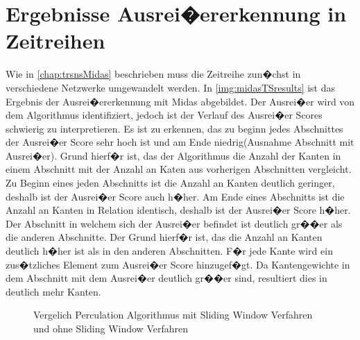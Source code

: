 \section{Ergebnisse Ausrei�ererkennung in Zeitreihen}
Wie in \autoref{chap:trsnsMidas} beschrieben muss die Zeitreihe zun�chst in verschiedene Netzwerke umgewandelt werden. In \autoref{img:midasTSresults} ist das Ergebnis der Ausrei�ererkennung mit Midas abgebildet. Der Ausrei�er wird von dem Algorithmus identifiziert, jedoch ist der Verlauf des Ausrei�er Scores schwierig zu interpretieren. Es ist zu erkennen, das zu beginn jedes Abschnittes der Ausrei�er Score sehr hoch ist und am Ende niedrig(Ausnahme Abschnitt mit Ausrei�er). Grund hierf�r ist, das der Algorithmus die Anzahl der Kanten in einem Abschnitt mit der Anzahl an Katen aus vorherigen Abschnitten vergleicht. Zu Beginn eines jeden Abschnitts ist die Anzahl an Kanten deutlich geringer, deshalb ist der Ausrei�er Score auch h�her. Am Ende eines Abschnitts ist die Anzahl an Kanten in Relation identisch, deshalb ist der Ausrei�er Score h�her. Der Abschnitt in welchem sich der Ausrei�er befindet ist deutlich gr��er als die anderen Abschnitte. Der Grund hierf�r ist, das die Anzahl an Kanten deutlich h�her ist als in den anderen Abschnitten. F�r jede Kante wird ein zus�tzliches Element zum Ausrei�er Score hinzugef�gt. Da Kantengewichte in dem Abschnitt mit dem Ausrei�er deutlich gr��er sind, resultiert dies in deutlich mehr Kanten. 
\label{sec:resultsOTs}

\begin{figure}[h]
	\centering
	\caption{Vergelich Perculation Algorithmus mit Sliding Window Verfahren und ohne Sliding Window Verfahren}
	\label{img:midasTSresults}
\end{figure}

